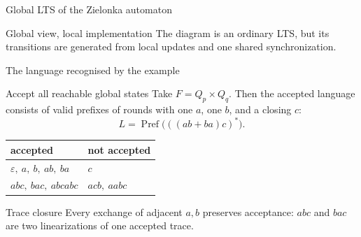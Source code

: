 \documentclass[t,11pt]{beamer}
\newcommand{\Pref}{\operatorname{Pref}}
\begin{document}
\begin{frame}{Global LTS of the Zielonka automaton}
  \begin{center}
  \end{center}
  \begin{block}{Global view, local implementation}
    The diagram is an ordinary LTS, but its transitions are generated from local updates and one shared synchronization.
  \end{block}
\end{frame}

\begin{frame}{The language recognised by the example}
  \begin{block}{Accept all reachable global states}
    Take $F=Q_p\times Q_q$. Then the accepted language consists of valid prefixes of rounds with one $a$, one $b$, and a closing $c$:
    \[
       L=\Pref\bigl(((ab+ba)c)^*\bigr).
    \]
  \end{block}
  \begin{center}
  \begin{tabular}{l|l}
    accepted & not accepted\\ \hline
    $\varepsilon,\ a,\ b,\ ab,\ ba$ & $c$\\
    $abc,\ bac,\ abcabc$ & $acb,\ aabc$
  \end{tabular}
  \end{center}
  \begin{block}{Trace closure}
    Every exchange of adjacent $a,b$ preserves acceptance: $abc$ and $bac$ are two linearizations of one accepted trace.
  \end{block}
\end{frame}
\end{document}
